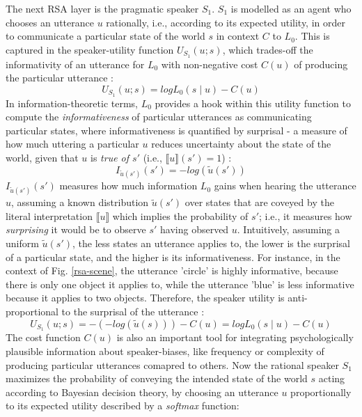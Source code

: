 The next RSA layer is the pragmatic speaker $S_1$. $S_1$ is modelled as an agent who chooses an utterance $u$ rationally, i.e., according to its expected utility, in order to communicate a particular state of the world $s$ in context $C$ to $L_0$. This is captured in the speaker-utility function $U_{S_1}(u; s)$, which trades-off the informativity of an utterance for $L_0$ with non-negative cost $C(u)$ of producing the particular utterance \parencite{problang}:
$$U_{S_1} (u;s) = log L_0(s \mid u) - C(u)$$
In information-theoretic terms, $L_0$ provides a hook within this utility function to compute the \emph{informativeness} of particular utterances as communicating particular states, 
where informativeness is quantified by surprisal - a measure of how much uttering a particular $u$ reduces uncertainty about the state of the world, given that $u$ is \emph{true of $s'$} (i.e., $\llbracket u \rrbracket (s') = 1$) \parencite{frank2012predicting}: 
$$I_{ \tilde{u} (s')}(s') = -log(\tilde{u} (s'))$$
$I_{\tilde{u} (s')}(s')$ measures how much information $L_0$ gains when hearing the utterance $u$, assuming a known distribution $\tilde{u} (s')$ over states that are coveyed by the literal interpretation $\llbracket u \rrbracket$ which implies the probability of $s'$; i.e., it measures how \emph{surprising} it would be to observe $s'$ having observed $u$.
Intuitively, assuming a uniform $\tilde{u} (s')$, the less states an utterance applies to, the lower is the surprisal of a particular state, and the higher is its informativeness. For instance, in the context of Fig. \ref{rsa-scene}, the utterance 'circle' is highly informative, because there is only one object it applies to, while the utterance 'blue' is less informative because it applies to two objects. 
Therefore, the speaker utility is anti-proportional to the surprisal of the utterance \parencite{frank2012predicting}:
$$U_{S_1} (u;s) = -(-log(\tilde{u}(s))) - C(u) = log L_0(s \mid u) - C(u)$$  %
The cost function $C(u)$ is also an important tool for integrating psychologically plausible information about speaker-biases, like frequency or complexity of producing particular utterances comapred to others. Now the rational speaker $S_1$ maximizes the probability of conveying the intended state of the world $s$ acting according to Bayesian decision theory, by choosing an utterance $u$ proportionally to its expected utility described by a \emph{softmax} function:

